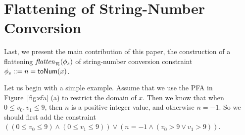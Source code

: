 \documentclass[sigplan,review,anonymous]{acmart}\settopmatter{printfolios=true,printccs=false,printacmref=false}
\begin{document}
%
%
%
%
%
%
%
%



\section{Flattening of String-Number Conversion} \label{section:s2i}

Last, we present the main contribution of this paper, 
the construction of a flattening $\mathit{flatten}_{\mathcal{R}}(\phi_s)$ of string-number conversion constraint $\phi_s ::= n=\mbox{\textsf{toNum}($x$)}$. 

Let us begin with a simple example. Assume that we use the PFA in Figure~\ref{fig:sfa} (a) to restrict the domain of $x$. Then we know that when $0\leq v_0,v_1 \leq 9$, then $n$ is a positive integer value, and otherwise $n =-1$. So we should first add the constraint $ ((0\leq v_0\leq 9) \wedge (0\leq v_1\leq 9)) \vee (n=-1 \wedge (v_0 >9 \vee v_1 >9))$.
\end{document}
